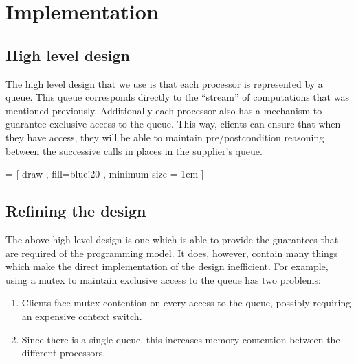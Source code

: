 \documentclass[a4]{article}
\begin{document}

\section{Implementation}
\subsection{High level design}
The high level design that we use is that each processor is
represented by a queue.
This queue corresponds directly to the ``stream'' of computations
that was mentioned previously.
Additionally each processor also has a mechanism to
guarantee exclusive access to the queue.
This way,
clients can ensure that when they have access,
they will be able to maintain pre/postcondition reasoning
between the successive calls in places in the supplier's queue.

 =
  [ draw
  , fill=blue!20
  , minimum size = 1em
  ]

\def\queueAt#1#2#3{
  \foreach \x in {0, 1,...,4} {
    \node[queue_block] at (#1 em + \x em, #2 em) (queue_block_\x_#3) {};
  }
}
\begin{center}
\end{center}
\subsection{Refining the design}
The above high level design is one which is able to provide
the guarantees that are required of the programming model.
It does, however, contain many things which make the
direct implementation of the design inefficient.
For example,
using a mutex to maintain exclusive access to the queue
has two problems:

\begin{enumerate}
\item Clients face mutex contention on every access to the queue,
  possibly requiring an expensive context switch.
\item Since there is a single queue, this increases memory contention between
  the different processors.
\end{enumerate}
\end{document}
